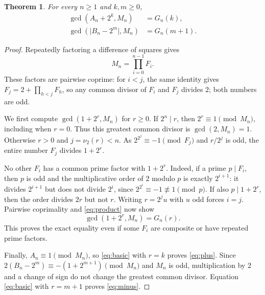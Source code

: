 \documentclass[11pt]{article}
\newtheorem{theorem}{Theorem}
\newcommand{\vTwo}{\nu_2}
\begin{document}
\begin{theorem}\label{thm:gcd}
For every $n\geq1$ and $k,m\geq0$,
\begin{align}
 \gcd(A_n+2^k,M_n)&=G_n(k),\label{eq:plus}\\
 \gcd(\lvert B_n-2^m\rvert,M_n)&=G_n(m+1).\label{eq:minus}
\end{align}
\end{theorem}

\begin{proof}
Repeatedly factoring a difference of squares gives
\begin{equation}\label{eq:product}
 M_n=\prod_{i=0}^{n-1}F_i.
\end{equation}
These factors are pairwise coprime: for $i<j$, the same identity gives
$F_j=2+\prod_{h<j}F_h$, so any common divisor of $F_i$ and $F_j$ divides
$2$; both numbers are odd.

We first compute $\gcd(1+2^r,M_n)$ for $r\geq0$.
If $2^n\mid r$, then $2^r\equiv1\pmod {M_n}$, including when $r=0$.
Thus this greatest common divisor is $\gcd(2,M_n)=1$.
Otherwise $r>0$ and $j=\vTwo(r)<n$. As $2^{2^j}\equiv-1\pmod {F_j}$
and $r/2^j$ is odd, the entire number $F_j$ divides $1+2^r$.

No other $F_i$ has a common prime factor with $1+2^r$.
Indeed, if a prime $p\mid F_i$, then $p$ is odd and the multiplicative
order of $2$ modulo $p$ is exactly $2^{i+1}$:
it divides $2^{i+1}$ but does not divide $2^i$, since
$2^{2^i}\equiv-1\not\equiv1\pmod p$.
If also $p\mid1+2^r$, then the order divides $2r$ but not $r$.
Writing $r=2^j u$ with $u$ odd forces $i=j$.
Pairwise coprimality and \eqref{eq:product} now show
\begin{equation}\label{eq:basic}
 \gcd(1+2^r,M_n)=G_n(r).
\end{equation}
This proves the exact equality even if some $F_i$ are composite or
have repeated prime factors.

Finally, $A_n\equiv1\pmod {M_n}$, so \eqref{eq:basic} with $r=k$
proves \eqref{eq:plus}. Since
$2(B_n-2^m)\equiv-(1+2^{m+1})\pmod {M_n}$ and $M_n$ is odd,
multiplication by $2$ and a change of sign do not change the greatest
common divisor. Equation \eqref{eq:basic} with $r=m+1$ proves
\eqref{eq:minus}.
\end{proof}
\end{document}
